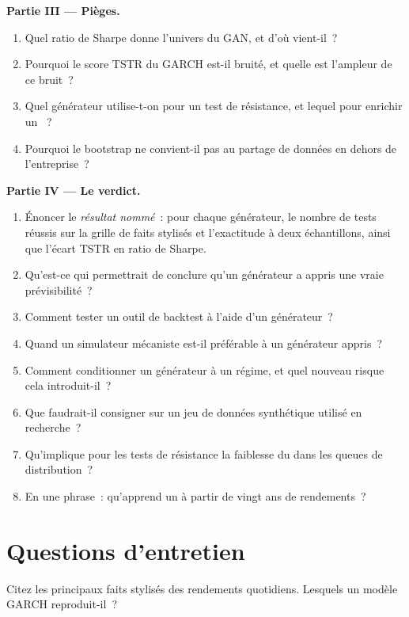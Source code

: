 \begin{problem}
\medskip\noindent\textbf{Partie III --- Pièges.}
\begin{enumerate}[resume]
\item Quel ratio de Sharpe donne l'univers du GAN, et d'où vient-il~?
\item Pourquoi le score TSTR du GARCH est-il bruité, et quelle est l'ampleur de ce bruit~?
\item Quel générateur utilise-t-on pour un test de résistance, et lequel pour enrichir un ~?
\item Pourquoi le bootstrap ne convient-il pas au partage de données en dehors de l'entreprise~?
\end{enumerate}

\medskip\noindent\textbf{Partie IV --- Le verdict.}
\begin{enumerate}[resume]
\item Énoncer le \emph{résultat nommé}~: pour chaque générateur, le nombre de tests réussis sur la grille de faits stylisés et l'exactitude à deux échantillons, ainsi que l'écart TSTR en
ratio de Sharpe.
\item Qu'est-ce qui permettrait de conclure qu'un générateur a appris une vraie prévisibilité~?
\item Comment tester un outil de backtest à l'aide d'un générateur~?
\item Quand un simulateur mécaniste est-il préférable à un générateur appris~?
\item Comment conditionner un générateur à un régime, et quel nouveau risque cela introduit-il~?
\item Que faudrait-il consigner sur un jeu de données synthétique utilisé en recherche~?
\item Qu'implique pour les tests de résistance la faiblesse du  dans les queues de distribution~?
\item En une phrase~: qu'apprend un  à partir de vingt ans de rendements~?
\end{enumerate}
\end{problem}

\section{Questions d'entretien}

\begin{interviewq}\label{iq:ml:generative-models-and-synthetic-data:1}
Citez les principaux faits stylisés des rendements quotidiens. Lesquels un modèle GARCH reproduit-il~?
\end{interviewq}

